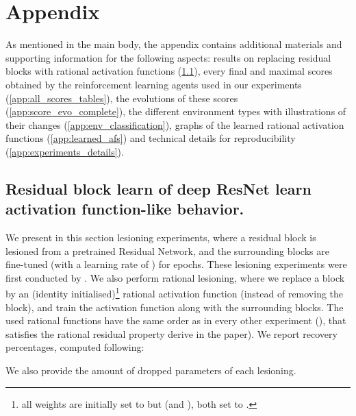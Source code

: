 \documentclass[accepted]{article}
\theoremstyle{plain}
\theoremstyle{definition}
\theoremstyle{remark}
\begin{document}
\section{Appendix}

As mentioned in the main body, the appendix contains additional materials and supporting information for the following aspects: results on replacing residual blocks with rational activation functions (\ref{sec:res_exp}), every final and maximal scores obtained by the reinforcement learning agents used in our experiments (\ref{app:all_scores_tables}), the evolutions of these scores (\ref{app:score_evo_complete}), the different environment types with illustrations of their changes (\ref{app:env_classification}), graphs of the learned rational activation functions (\ref{app:learned_afs}) and technical details for reproducibility (\ref{app:experiments_details}).

\subsection{Residual block learn of deep ResNet learn activation function-like behavior.}
\label{sec:res_exp}
We present in this section lesioning experiments, where a residual block is lesioned from a pretrained Residual Network, and the surrounding blocks are fine-tuned (with a learning rate of ) for  epochs. These lesioning experiments were first conducted by \citeauthor{VeitWB16} . We also perform rational lesioning, where we replace a block by an (identity initialised)\footnote{all weights are initially set to  but  (and ), both set to .} rational activation function (instead of removing the block), and train the activation function along with the surrounding blocks. The used rational functions have the same order as in every other experiment (), that satisfies the rational residual property derive in the paper). We report recovery percentages, computed following:

We also provide the amount of dropped parameters of each lesioning.
\end{document}

